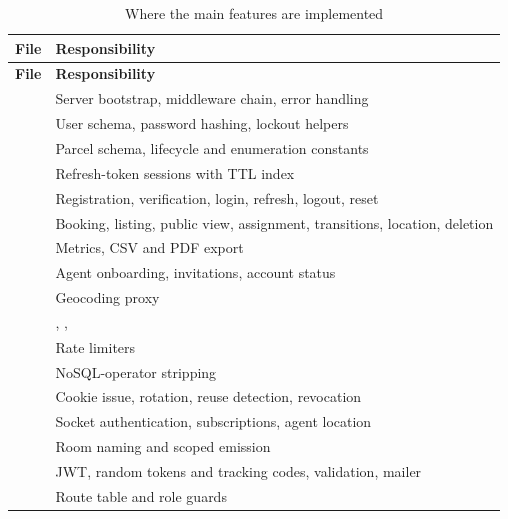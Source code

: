 \begin{small}
\begin{longtable}{@{}P{6.2cm}P{7.6cm}@{}}
\caption{Where the main features are implemented}\label{tab:source}\\
\toprule
\textbf{File} & \textbf{Responsibility} \\
\midrule
\endfirsthead
\toprule
\textbf{File} & \textbf{Responsibility} \\
\midrule
\endhead
{} & Server bootstrap, middleware chain, error handling \\
 & User schema, password hashing, lockout helpers \\
 & Parcel schema, lifecycle and enumeration constants \\
 & Refresh-token sessions with TTL index \\
 & Registration, verification, login, refresh, logout, reset \\
 & Booking, listing, public view, assignment, transitions, location, deletion \\
 & Metrics, CSV and PDF export \\
 & Agent onboarding, invitations, account status \\
 & Geocoding proxy \\
 & , ,  \\
 & Rate limiters \\
 & NoSQL-operator stripping \\
 & Cookie issue, rotation, reuse detection, revocation \\
 & Socket authentication, subscriptions, agent location \\
 & Room naming and scoped emission \\
 & JWT, random tokens and tracking codes, validation, mailer \\
 & Route table and role guards \\

\end{longtable}
\end{small}
